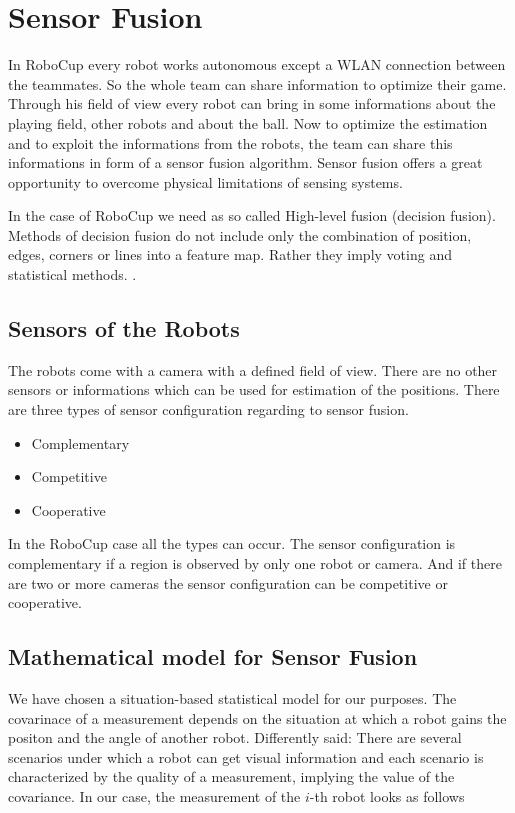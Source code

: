 
\chapter{Sensor Fusion}
In RoboCup every robot works autonomous except a WLAN connection between the teammates. So the whole team can share information to optimize their game.
Through his field of view every robot can bring in some informations about the playing field, other robots and about the ball. Now to optimize the estimation and to exploit the informations from the robots, the team can share this informations in form of a sensor fusion algorithm.
Sensor fusion offers a great opportunity to overcome physical limitations of sensing systems.\cite{IntroSF} 

In the case of RoboCup we need as so called High-level fusion (decision fusion). Methods of decision fusion do not include only the combination of position, edges, corners or lines into a feature map. Rather they imply voting and statistical methods. \cite{IntroSF}. 


\section{Sensors of the Robots}
The robots come with a camera with a defined field of view. There are no other sensors or informations which can be used for estimation of the positions. 
There are three types of sensor configuration regarding to sensor fusion. \cite{IntroSF}
\begin{itemize}
	\item Complementary
	\item Competitive
	\item Cooperative
\end{itemize}
In the RoboCup case all the types can occur. The sensor configuration is complementary if a region is  observed by only one robot or camera. And if there are two or more cameras the sensor configuration can be competitive or cooperative.


\section{Mathematical model for Sensor Fusion}

We have chosen a situation-based statistical model for our purposes. The covarinace of a measurement depends on the situation at which a robot gains the positon and the angle of another robot. Differently said: There are several scenarios under which a robot can get visual information and each scenario is characterized by the quality of a measurement, implying the value of the covariance. In our case, the measurement of the \(i\)-th robot looks as follows

